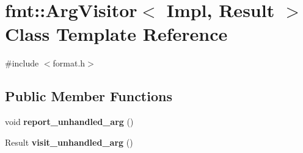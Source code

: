 \hypertarget{classfmt_1_1ArgVisitor}{}\section{fmt\+:\+:Arg\+Visitor$<$ Impl, Result $>$ Class Template Reference}
\label{classfmt_1_1ArgVisitor}


{\ttfamily \#include $<$format.\+h$>$}

\subsection*{Public Member Functions}
\begin{DoxyCompactItemize}
\item 
void {\bfseries report\+\_\+unhandled\+\_\+arg} ()\hypertarget{classfmt_1_1ArgVisitor_a130090f53213407548d93d8ee2801738}{}\label{classfmt_1_1ArgVisitor_a130090f53213407548d93d8ee2801738}

\item 
Result {\bfseries visit\+\_\+unhandled\+\_\+arg} ()\hypertarget{classfmt_1_1ArgVisitor_a8de54a54b863eb63b5c45c4495c12793}{}\label{classfmt_1_1ArgVisitor_a8de54a54b863eb63b5c45c4495c12793}


\end{DoxyCompactItemize}
